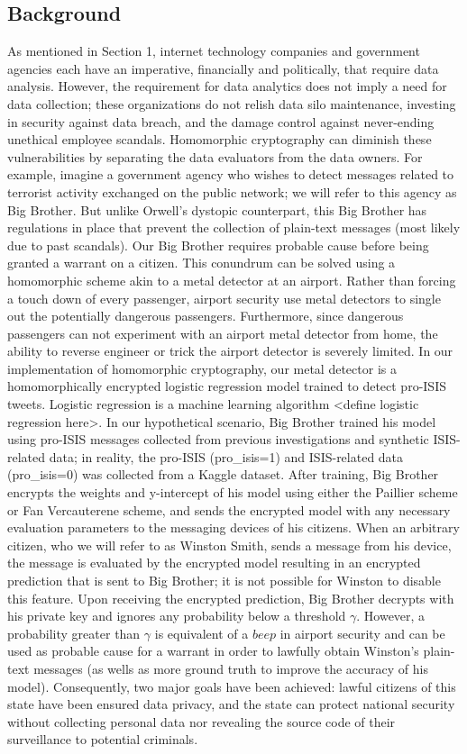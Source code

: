 \documentclass[10pt, a4paper]{article}
\begin{document}
	\subsection{Background}
	As mentioned in Section 1, internet technology companies and government agencies each have an imperative, financially and politically, that require data analysis. However, the requirement for data analytics does not imply a need for data collection;  these organizations do not relish data silo maintenance, investing in security against data breach, and the damage control against never-ending unethical employee scandals. Homomorphic cryptography can diminish these vulnerabilities by separating the data evaluators from the data owners. For example, imagine a government agency who wishes to detect messages related to terrorist activity exchanged on the public network; we will refer to this agency as Big Brother. But unlike Orwell's dystopic counterpart, this Big Brother has regulations in place that prevent the collection of plain-text messages (most likely due to past scandals). Our Big Brother requires probable cause before being granted a warrant on a citizen. This conundrum can be solved using a homomorphic scheme akin to a metal detector at an airport. Rather than forcing a touch down of every passenger, airport security use metal detectors to single out the potentially dangerous passengers. Furthermore, since dangerous passengers can not experiment with an airport metal detector from home, the ability to reverse engineer or trick the airport detector is severely limited.  In our implementation of homomorphic cryptography, our metal detector is a homomorphically encrypted logistic regression model trained to detect pro-ISIS tweets. Logistic regression is a machine learning algorithm <define logistic regression here>. In our hypothetical scenario,  Big Brother trained his model using pro-ISIS messages collected from previous investigations and synthetic ISIS-related data; in reality, the pro-ISIS (pro_isis=1) and ISIS-related data (pro_isis=0) was collected from a Kaggle dataset. After training, Big Brother encrypts the weights and y-intercept of his model using either the Paillier scheme or Fan Vercauterene scheme, and sends the encrypted model with any necessary evaluation parameters to the messaging devices of his citizens. When an arbitrary citizen, who we will refer to as Winston Smith, sends a message from his device, the message is evaluated by the encrypted model resulting in an encrypted prediction that is sent to Big Brother; it is not possible for Winston to disable this feature. Upon receiving the encrypted prediction, Big Brother decrypts with his private key and ignores any probability below a threshold $\gamma$. However, a probability greater than $\gamma$ is equivalent of a $beep$ in airport security and can be used as probable cause for a warrant in order to lawfully obtain Winston's plain-text messages (as wells as more ground truth to improve the accuracy of his model). Consequently, two major goals have been achieved:  lawful citizens of this state have been ensured data privacy, and the state can protect national security without collecting personal data nor revealing the source code of their surveillance to potential criminals. 
\end{document}
